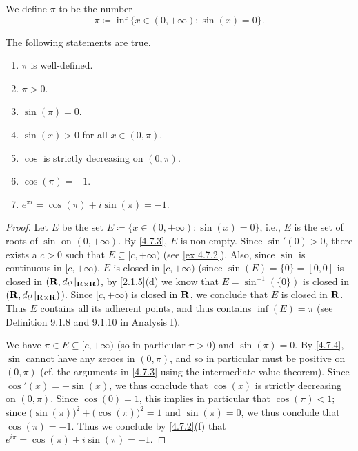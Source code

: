 \begin{definition}\label{4.7.4}
  We define \(\pi\) to be the number
  \[
    \pi \coloneqq \inf\{x \in (0, +\infty) : \sin(x) = 0\}.
  \]
\end{definition}

\begin{additional corollary}\label{ac 4.7.2}
The following statements are true.
\begin{enumerate}
  \item \(\pi\) is well-defined.
  \item \(\pi > 0\).
  \item \(\sin(\pi) = 0\).
  \item \(\sin(x) > 0\) for all \(x \in (0, \pi)\).
  \item \(\cos\) is strictly decreasing on \((0, \pi)\).
  \item \(\cos(\pi) = -1\).
  \item \(e^{\pi i} = \cos(\pi) + i \sin(\pi) = -1\).
\end{enumerate}
\end{additional corollary}

\begin{proof}
  Let \(E\) be the set \(E \coloneqq \{x \in (0, +\infty) : \sin(x) = 0\}\), i.e., \(E\) is the set of roots of \(\sin\) on \((0, +\infty)\).
  By \cref{4.7.3}, \(E\) is non-empty.
  Since \(\sin'(0) > 0\), there exists a \(c > 0\) such that \(E \subseteq [c, +\infty)\) (see \cref{ex 4.7.2}).
  Also, since \(\sin\) is continuous in \([c, +\infty)\), \(E\) is closed in \([c, +\infty)\)
  (since \(\sin(E) = \{0\} = [0, 0]\) is closed in \((\mathbf{R}, d_{l^1}|_{\mathbf{R} \times \mathbf{R}})\), by \cref{2.1.5}(d) we know that \(E = \sin^{-1}(\{0\})\) is closed in \((\mathbf{R}, d_{l^1}|_{\mathbf{R} \times \mathbf{R}})\)).
  Since \([c, +\infty)\) is closed in \(\mathbf{R}\), we conclude that \(E\) is closed in \(\mathbf{R}\).
  Thus \(E\) contains all its adherent points, and thus contains \(\inf(E) = \pi\) (see Definition 9.1.8 and 9.1.10 in Analysis I).

  We have \(\pi \in E \subseteq [c, +\infty)\) (so in particular \(\pi > 0\)) and \(\sin(\pi) = 0\).
  By \cref{4.7.4}, \(\sin\) cannot have any zeroes in \((0, \pi)\), and so in particular must be positive on \((0, \pi)\)
  (cf. the arguments in \cref{4.7.3} using the intermediate value theorem).
  Since \(\cos'(x) = -\sin(x)\), we thus conclude that \(\cos(x)\) is strictly decreasing on \((0, \pi)\).
  Since \(\cos(0) = 1\), this implies in particular that \(\cos(\pi) < 1\);
  since \(\big(\sin(\pi)\big)^2 + \big(\cos(\pi)\big)^2 = 1\) and \(\sin(\pi) = 0\), we thus conclude that \(\cos(\pi) = -1\).
  Thus we conclude by \cref{4.7.2}(f) that \(e^{i \pi} = \cos(\pi) + i \sin(\pi) = -1\).
\end{proof}

